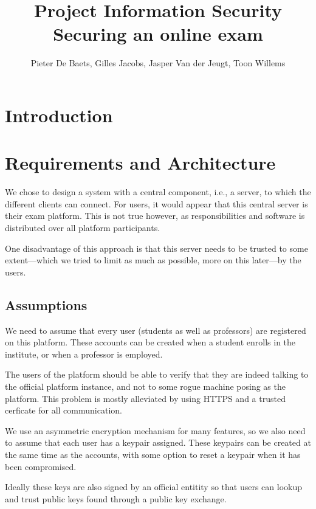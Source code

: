 \documentclass{article}
\title{Project Information Security \\ Securing an online exam}
\author{Pieter De Baets, Gilles Jacobs, Jasper Van der Jeugt, Toon Willems}
\begin{document}
\maketitle
\tableofcontents

\newpage

\section{Introduction}

\section{Requirements and Architecture}

We chose to design a system with a central component, i.e., a server, to which
the different clients can connect. For users, it would appear that this central
server is their exam platform. This is not true however, as responsibilities and
software is distributed over all platform participants.

One disadvantage of this approach is that
this server needs to be trusted to some extent---which we tried to limit as much
as possible, more on this later---by the users.

\subsection{Assumptions}

We need to assume that every user (students as well as professors) are
registered on this platform. These accounts can be created when a student
enrolls in the institute, or when a professor is employed.

The users of the platform should be able to verify that they are indeed
talking to the official platform instance, and not to some rogue machine posing
as the platform. This problem is mostly alleviated by using HTTPS and a trusted
cerficate for all communication.


We use an asymmetric encryption mechanism for many features, so we also need to
assume that each user has a keypair assigned. These keypairs can be created at
the same time as the accounts, with some option to reset a keypair when it has
been compromised.

Ideally these keys are also signed by an official entitity so
that users can lookup and trust public keys found through a public key exchange.
\end{document}
